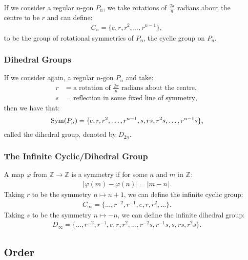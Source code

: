 If we consider a regular $n$-gon $P_n$, we take rotations of
$\frac{2\pi}{n}$ radians about the centre to be $r$ and can define: \begin{align*}
    C_n = \{e, r, r^2, \ldots, r^{n - 1}\},
\end{align*} to be the group of rotational symmetries of $P_n$, the cyclic
group on $P_n$.

\subsubsection{Dihedral Groups}

If we consider again, a regular $n$-gon $P_n$ and take: \begin{align*}
    r &= \text{a rotation of } \frac{2\pi}{n} \text{ radians about the centre}, \\
    s &= \text{reflection in some fixed line of symmetry},
\end{align*} then we have that: \begin{align*}
    \operatorname{Sym}(P_n) = \{e, r, r^2, \ldots, r^{n - 1}, s, rs, r^2s, \ldots, r^{n - 1}s\},
\end{align*} called the dihedral group, denoted by $D_{2n}$.

\subsubsection{The Infinite Cyclic/Dihedral Group}

A map $\varphi$ from $\mathbb{Z} \to \mathbb{Z}$ is a symmetry if for some
$n$ and $m$ in $\mathbb{Z}$: \begin{align*}
    |\varphi(m) - \varphi(n)| = |m - n|.
\end{align*} Taking $r$ to be the symmetry $n \mapsto n + 1$, we can define the
infinite cyclic group: \begin{align*}
    C_\infty = \{\ldots, r^{-2}, r^{-1}, e, r, r^2, \ldots\}.
\end{align*} Taking $s$ to be the symmetry $n \mapsto -n$, we can define the
infinite dihedral group: \begin{align*}
    D_\infty = \{\ldots, r^{-2}, r^{-1}, e, r, r^2, \ldots, r^{-2}s, r^{-1}s, s, rs, r^2s\}.
\end{align*}

\subsection{Order}

